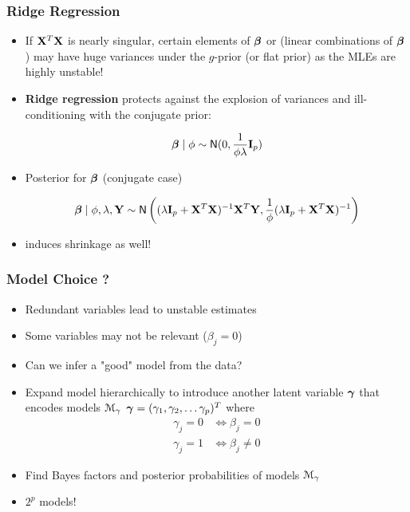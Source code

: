 \documentclass[handout]{beamer}
\begin{document}
\begin{frame}\frametitle{Ridge Regression}

\begin{itemize}

\item If $\mathbf{X}^T\mathbf{X}$ is nearly singular, certain  elements of $\boldsymbol{\beta}$ or (linear combinations of $\boldsymbol{\beta}$) may have huge variances under the $g$-prior (or flat prior) as the MLEs are highly unstable!


\item {\bf Ridge regression} protects against the explosion of variances and ill-conditioning with the conjugate prior:

$$\boldsymbol{\beta} \mid \phi \sim \textsf{N}(0, \frac{1}{\phi \lambda} \mathbf{I}_p)$$

\item Posterior for $\boldsymbol{\beta}$  (conjugate case)

$$\boldsymbol{\beta} \mid \phi, \lambda, \mathbf{Y} \sim \textsf{N} \left((\lambda \mathbf{I}_p + \mathbf{X}^T\mathbf{X})^{-1} \mathbf{X}^T \mathbf{Y},  \frac{1}{\phi}(\lambda \mathbf{I}_p + \mathbf{X}^T\mathbf{X})^{-1}\right)$$

\item induces shrinkage as well!
\end{itemize}
\end{frame}

\begin{frame} \frametitle{Model Choice ?}
\begin{itemize}
  \item Redundant variables lead to unstable estimates \pause
  \item Some variables may not be relevant ($\beta_j = 0$) \pause
  \item Can we infer a "good" model from the data?
  \item Expand model hierarchically to introduce another latent variable $\boldsymbol{\gamma}$ that encodes models ${\cal M}_\gamma$
  $\boldsymbol{\gamma} = (\gamma_1, \gamma_2, \ldots \gamma_p)^T$ where
  \begin{align*}
  \gamma_j = 0 & \Leftrightarrow \beta_j = 0 \\
  \gamma_j = 1 &  \Leftrightarrow \beta_j \neq 0 
  \end{align*}
  \item Find Bayes factors and posterior probabilities of models ${\cal M}_\gamma$
  \item $2^p$ models!
  
  
  
\end{itemize}


\end{frame}
\end{document}
